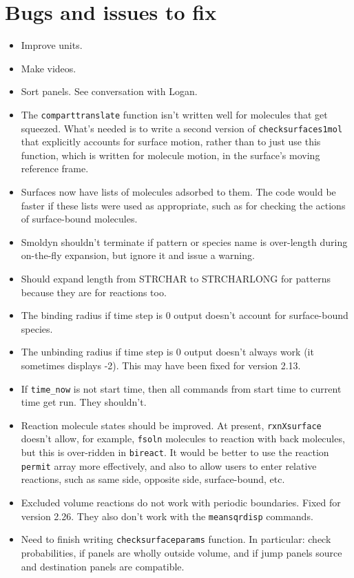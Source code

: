 \documentclass {scrbook}
\newcommand {\ttt} {\texttt}
\begin{document}
\section{Bugs and issues to fix}
\begin{itemize}
\item Improve units.
\item Make videos.
\item Sort panels. See conversation with Logan.
\item The \ttt{comparttranslate} function isn't written well for molecules that get squeezed. What's needed is to write a second version of \ttt{checksurfaces1mol} that explicitly accounts for surface motion, rather than to just use this function, which is written for molecule motion, in the surface's moving reference frame.
\item Surfaces now have lists of molecules adsorbed to them. The code would be faster if these lists were used as appropriate, such as for checking the actions of surface-bound molecules.
\item Smoldyn shouldn't terminate if pattern or species name is over-length during on-the-fly expansion, but ignore it and issue a warning.
\item Should expand length from STRCHAR to STRCHARLONG for patterns because they are for reactions too.
\item The binding radius if time step is 0 output doesn't account for surface-bound species.
\item The unbinding radius if time step is 0 output doesn't always work (it sometimes displays -2). This may have been fixed for version 2.13.
\item If \ttt{time\_now} is not start time, then all commands from start time to current time get run. They shouldn't.
\item Reaction molecule states should be improved. At present, \ttt{rxnXsurface} doesn't allow, for example, \ttt{fsoln} molecules to reaction with back molecules, but this is over-ridden in \ttt{bireact}. It would be better to use the reaction \ttt{permit} array more effectively, and also to allow users to enter relative reactions, such as same side, opposite side, surface-bound, etc.
\item Excluded volume reactions do not work with periodic boundaries. Fixed for version 2.26. They also don't work with the \ttt{meansqrdisp} commands.
\item Need to finish writing \ttt{checksurfaceparams} function. In particular: check probabilities, if panels are wholly outside volume, and if jump panels source and destination panels are compatible.

\end{itemize}
\end{document}
